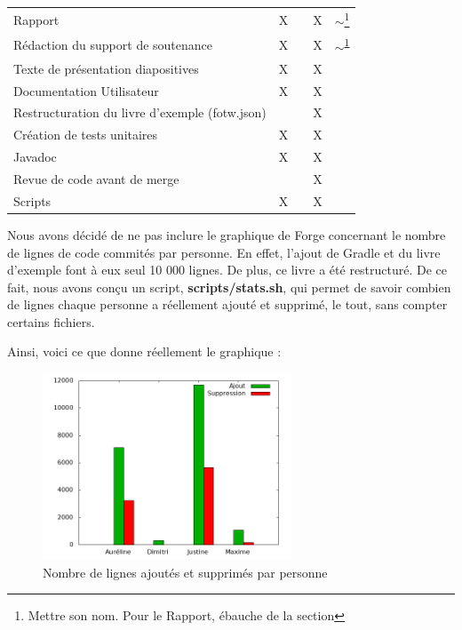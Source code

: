 \begin{centering}
\begin{longtable}{|p{8cm}|c|c|c|c|}
				\rowcolor{lightgray} \multicolumn{5}{|c|}{ \textbf{Autre}}\\
				\hline
				Rapport & X & & X & $\sim$\footnote{\label{footnote:nom}Mettre son nom. Pour le Rapport, ébauche de la section \nameref{sec:arborescenceProjet}}\\
				\hline
				Rédaction du support de soutenance & X & & X & $\sim$\textsuperscript{\ref{footnote:nom}}\\
				\hline
				Texte de présentation diapositives & X & & X &\\
				\hline
				Documentation Utilisateur & X & & X &\\
				\hline
				Restructuration du livre d'exemple (fotw.json) & & & X & \\
				\hline
				Création de tests unitaires & X & & X & \\
				\hline
				Javadoc & X & & X & \\
				\hline
				Revue de code avant de merge & & & X & \\
				\hline
				Scripts & X & & X & \\
				\hline
			\end{longtable}
		\end{centering}

		Nous avons décidé de ne pas inclure le graphique de Forge concernant le nombre de lignes de code commités par personne. En effet, l'ajout de Gradle et du livre d'exemple font à eux seul 10 000 lignes. De plus, ce livre a été restructuré. De ce fait, nous avons conçu un script, \textbf{scripts/stats.sh}, qui permet de savoir combien de lignes chaque personne a réellement ajouté et supprimé, le tout, sans compter certains fichiers.

		Ainsi, voici ce que donne réellement le graphique :

		\begin{figure}[H]
			\centering\includegraphics[width=0.66\textwidth, keepaspectratio]{img/repo_stats.png}
			\caption{Nombre de lignes ajoutés et supprimés par personne}
		\end{figure}

